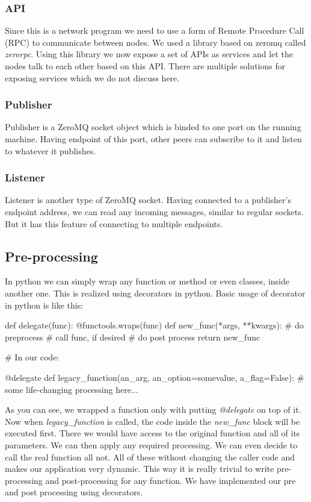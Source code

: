 \subsubsection{API}
Since this is a network program we need to use a form of Remote Procedure Call (RPC) 
to communicate between nodes. We used a library based on zeromq 
called \textit{zerorpc}. Using this library we now expose a set of APIs as services and let the nodes talk to 
each other based on this API. There are multiple solutions for exposing services which we do not discuss here.

\subsubsection{Publisher}
Publisher is a ZeroMQ socket object which is binded to one port on the running machine. 
Having endpoint of this port, other peers can subscribe to it and listen to whatever it publishes.

\subsubsection{Listener}
Listener is another type of ZeroMQ socket. 
Having connected to a publisher's endpoint address, 
we can read any incoming messages, similar to regular sockets.
But it has this feature of connecting to multiple endpoints.

\subsection{Pre-processing}
In python we can simply wrap any function or method or even classes, inside another one.
This is realized using decorators in python. 
Basic usage of decorator in python is like this:

\begin{python}
def delegate(func):
    @functools.wraps(func)
    def new_func(*args, **kwargs):
        # do preprocess
        # call func, if desired
        # do post process
    return new_func

# In our code:

@delegate
def legacy_function(an_arg, an_option=somevalue, a_flag=False):
    # some life-changing processing here...

\end{python}
As you can see, we wrapped a function only with putting \textit{@delegate} on top of it.
Now when \textit{legacy\_function} is called, the code inside the \textit{new\_func} block
will be executed first. 
There we would have access to the original function and all of its parameters. 
We can then apply any required processing. 
We can even decide to call the real function all not.
All of these without changing the caller code and makes our application very dynamic.
This way it is really trivial to write pre-processing and post-processing for any function.
We have implemented our pre and post processing using decorators.

